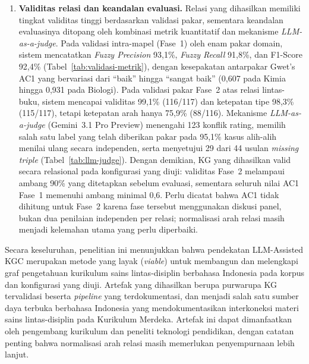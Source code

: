 \documentclass[../../thesis]{subfiles}
\begin{document}
\begin{enumerate}
  \item \textbf{Validitas relasi dan keandalan evaluasi.}
        Relasi yang dihasilkan memiliki tingkat validitas tinggi berdasarkan
        validasi pakar, sementara keandalan evaluasinya ditopang oleh kombinasi
        metrik kuantitatif dan mekanisme \textit{LLM-as-a-judge}. Pada validasi
        intra-mapel (Fase~1) oleh enam pakar domain, sistem mencatatkan
        \textit{Fuzzy Precision} 93{,}1\%, \textit{Fuzzy Recall} 91{,}8\%, dan
        F1-Score 92{,}4\% (Tabel~\ref{tab:validasi-metrik}), dengan kesepakatan
        antarpakar Gwet's AC1 yang bervariasi dari ``baik'' hingga ``sangat
        baik'' (0{,}607 pada Kimia hingga 0{,}931 pada Biologi). Pada validasi
        pakar Fase~2 atas relasi lintas-buku, sistem mencapai validitas 99{,}1\%
        (116/117) dan ketepatan tipe 98{,}3\% (115/117), tetapi ketepatan arah
        hanya 75{,}9\% (88/116). Mekanisme \textit{LLM-as-a-judge}
        (Gemini~3.1 Pro Preview) menengahi 123 konflik rating, memilih salah satu
        label yang telah diberikan pakar pada 95{,}1\% kasus alih-alih menilai
        ulang secara independen, serta menyetujui 29 dari 44 usulan
        \textit{missing triple} (Tabel~\ref{tab:llm-judge}). Dengan demikian,
        KG yang dihasilkan valid secara relasional pada konfigurasi yang diuji:
        validitas Fase~2 melampaui ambang 90\% yang ditetapkan sebelum
        evaluasi, sementara seluruh nilai AC1 Fase~1 memenuhi ambang minimal
        0{,}6. Perlu dicatat bahwa AC1 tidak dihitung untuk Fase~2 karena fase
        tersebut menggunakan diskusi panel, bukan dua penilaian independen per
        relasi; normalisasi arah relasi masih menjadi kelemahan utama yang perlu
        diperbaiki.
\end{enumerate}

Secara keseluruhan, penelitian ini menunjukkan bahwa pendekatan LLM-Assisted KGC
merupakan metode yang layak (\textit{viable}) untuk membangun dan melengkapi graf
pengetahuan kurikulum sains lintas-disiplin berbahasa Indonesia pada korpus dan
konfigurasi yang diuji. Artefak yang
dihasilkan berupa purwarupa KG tervalidasi beserta \textit{pipeline} yang
terdokumentasi, dan menjadi salah satu sumber daya terbuka berbahasa Indonesia
yang mendokumentasikan interkoneksi materi sains lintas-disiplin pada Kurikulum
Merdeka. Artefak ini dapat dimanfaatkan oleh pengembang kurikulum dan peneliti
teknologi pendidikan, dengan catatan
penting bahwa normalisasi arah relasi masih memerlukan penyempurnaan lebih lanjut.

\end{document}
